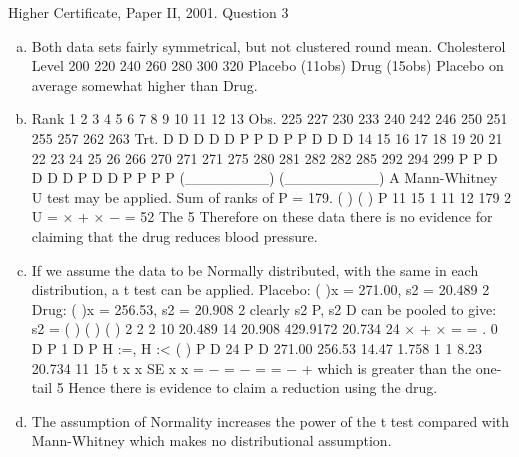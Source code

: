 \documentclass[a4paper,12pt]{article}
\begin{document}

Higher Certificate, Paper II, 2001. Question 3
\begin{enumerate}[(a)]
\item  Both data sets fairly symmetrical, but not clustered round mean.
Cholesterol Level
200 220 240 260 280 300 320
Placebo (11obs)
Drug (15obs)
Placebo on average somewhat higher than Drug.
\item 
Rank 1 2 3 4 5 6 7 8 9 10 11 12 13
Obs. 225 227 230 233 240 242 246 250 251 255 257 262 263
Trt. D D D D D P P D P P D D D
14 15 16 17 18 19 20 21 22 23 24 25 26
266 270 271 271 275 280 281 282 282 285 292 294 299
P P D D D D P D D P P P P
(________) (_________)
A Mann-Whitney U test may be applied.
Sum of ranks of P = 179. ( ) ( ) P
11 15 1 11 12 179
2
U = × + × −
= 52
The 5%
Therefore on these data there is no evidence for claiming that the drug reduces blood
pressure.
\item If we assume the data to be Normally distributed, with the same  in each
distribution, a t test can be applied.
Placebo: ( )x = 271.00, s2 = 20.489 2
Drug: ( )x = 256.53, s2 = 20.908 2
clearly s2
P, s2
D can be pooled to give:
s2 = ( ) ( ) ( )
2 2
2 10 20.489 14 20.908
429.9172 20.734
24
× + ×
= = .
0 D P 1 D P H :\mu =\mu , H :\mu < \mu
( )
P D
24
P D
271.00 256.53 14.47 1.758
1 1 8.23 20.734
11 15
t x x
SE x x
= − = − = =
−
+
which is greater than the one-tail 5%
Hence there is evidence to claim a reduction using the drug.
\item The assumption of Normality increases the power of the t test compared with
Mann-Whitney which makes no distributional assumption.
\end{enumerate}
\end{document}
